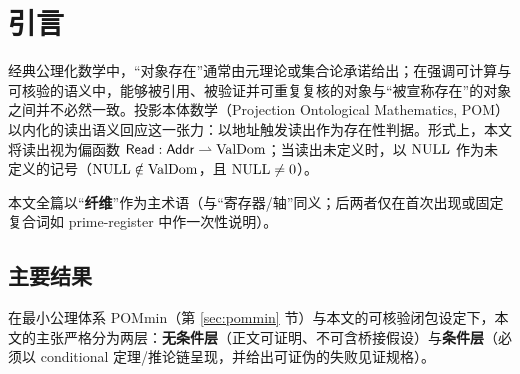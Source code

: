 \section{引言}

经典公理化数学中，“对象存在”通常由元理论或集合论承诺给出；在强调可计算与可核验的语义中，能够被引用、被验证并可重复复核的对象与“被宣称存在”的对象之间并不必然一致。投影本体数学（Projection Ontological Mathematics, POM）以内化的读出语义回应这一张力：以地址触发读出作为存在性判据。形式上，本文将读出视为偏函数 $\mathsf{Read}:\mathsf{Addr}\rightharpoonup \mathrm{ValDom}$；当读出未定义时，以 $\mathrm{NULL}$ 作为未定义的记号（$\mathrm{NULL}\notin\mathrm{ValDom}$，且 $\mathrm{NULL}\neq 0$）。\par
本文全篇以“\textbf{纤维}”作为主术语（与“寄存器/轴”同义；后两者仅在首次出现或固定复合词如 prime-register 中作一次性说明）。

\subsection{主要结果}
在最小公理体系 POMmin（第 \ref{sec:pommin} 节）与本文的可核验闭包设定下，本文的主张严格分为两层：\textbf{无条件层}（正文可证明、不可含桥接假设）与\textbf{条件层}（必须以 conditional 定理/推论链呈现，并给出可证伪的失败见证规格）。

